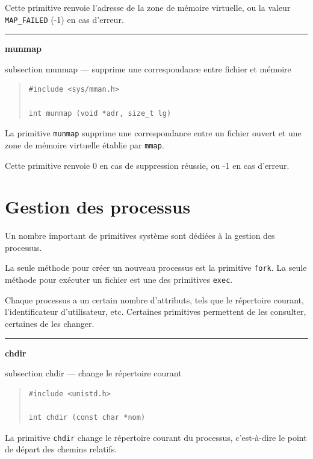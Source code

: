 \documentclass [twoside] {report}
\newcommand {\primitive} [1]
    {
	\phantomsection
	{\large \textbf {#1}}
	\addcontentsline {toc} {subsection} {#1}
    }
\newcommand {\separation}
    {
	\vspace {5mm}
	\nopagebreak
	\hrule
    }
\begin{document}
Cette primitive renvoie l'adresse de la zone de mémoire virtuelle, ou
la valeur \texttt {MAP\_FAILED} (-1) en cas d'erreur.


\separation
\primitive {munmap} --- supprime une correspondance entre fichier et mémoire

\begin {quote}
\begin {verbatim}
#include <sys/mman.h>

int munmap (void *adr, size_t lg)
\end{verbatim}
\end {quote}

La primitive \texttt {munmap} supprime une correspondance entre un fichier
ouvert et une zone de mémoire virtuelle établie par \texttt {mmap}.

Cette primitive renvoie 0 en cas de suppression réussie, ou -1 en
cas d'erreur.



\section {Gestion des processus}


Un nombre important de primitives système sont
dédiées à la gestion des processus.

La seule méthode pour créer un nouveau processus
est la primitive \texttt {fork}. La seule méthode pour
exécuter un fichier est une des primitives
\texttt {exec}.

Chaque processus a un certain nombre
d'attributs, tels que le répertoire courant,
l'identificateur d'utilisateur, etc. Certaines
primitives permettent de les consulter, certaines
de les changer.


\separation
\primitive {chdir} --- change le répertoire courant

\begin {quote}
\begin {verbatim}
#include <unistd.h>

int chdir (const char *nom)
\end{verbatim}
\end {quote}

La primitive \texttt {chdir} change le répertoire
courant du processus, c'est-à-dire le point de
départ des chemins relatifs.
\end{document}

